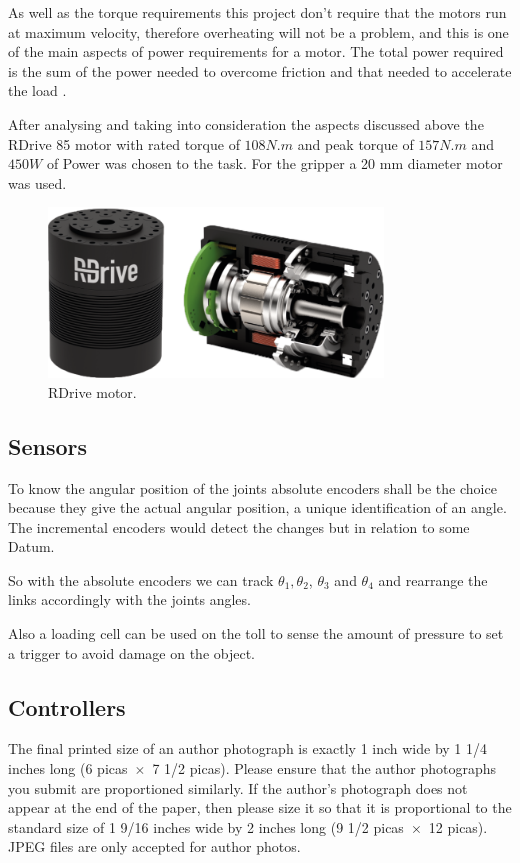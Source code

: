 \documentclass[transmag]{IEEEtran}
\begin{document}
As well as the torque requirements this project don't require that the motors run at maximum velocity, therefore overheating will not be a problem, and this is one of the main aspects of power requirements for a motor. The total power required is the sum of the power needed to overcome friction and that needed to accelerate the load \cite{ref4}.


After analysing and taking into consideration the aspects discussed above the RDrive 85 motor with rated torque of $108 N.m$ and peak torque of $157 N.m$ and $450W$ of Power was chosen to the task. \cite{ref8} For the gripper a 20 mm diameter motor was used.


 

\begin{figure}
\centerline{\includegraphics[width=3.5in]{./images/Motor}}
\caption{RDrive motor.\label{Motor}}
\end{figure}



\subsection{Sensors}

To know the angular position of the joints absolute encoders shall be the choice because they give the actual angular position, a unique identification of an angle. The incremental encoders would detect the changes but in relation to some Datum. \cite{ref3}

So with the absolute encoders we can track $\theta_1,\theta_2$, $\theta_3$ and $\theta_4$ and rearrange the links accordingly with the joints angles.

Also a loading cell can be used on the toll to sense the amount of pressure to set a trigger to avoid damage on the object.


\subsection{Controllers}

The final printed size of an author photograph is exactly 
1 inch wide by 1 1/4 inches long (6 picas~$\times$~7 1/2 picas). Please 
ensure that the author photographs you submit are proportioned similarly. If 
the author's photograph does not appear at the end of the paper, then please 
size it so that it is proportional to the standard size of 1 9/16 inches 
wide by 
2 inches long (9 1/2 picas~$\times$~12 picas). JPEG files are only 
accepted for author photos.
\end{document}
